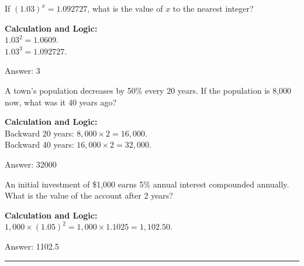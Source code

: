 \documentclass[11pt,paper=a4,answers]{exam}
\begin{document}
\begin{questions}
\vspace{40pt}

\question
If $(1.03)^x = 1.092727$, what is the value of $x$ to the nearest integer?

\begin{solution}
\textbf{Calculation and Logic:} \\
$1.03^2 = 1.0609$. \\
$1.03^3 = 1.092727$.

\vspace{25pt}

Answer: \colorbox{yellow!100}{3}
\end{solution}

\vspace{40pt}

\question
A town's population decreases by 50\% every 20 years. If the population is 8,000 now, what was it 40 years ago?

\begin{solution}
\textbf{Calculation and Logic:} \\
Backward 20 years: $8,000 \times 2 = 16,000$. \\
Backward 40 years: $16,000 \times 2 = 32,000$.

\vspace{25pt}

Answer: \colorbox{yellow!100}{32000}
\end{solution}

\vspace{40pt}

\question
An initial investment of \$1,000 earns 5\% annual interest compounded annually. What is the value of the account after 2 years?

\begin{solution}
\textbf{Calculation and Logic:} \\
$1,000 \times (1.05)^2 = 1,000 \times 1.1025 = 1,102.50$.

\vspace{25pt}

Answer: \colorbox{yellow!100}{1102.5}
\end{solution}


\end{questions}
\begin{center}
\rule{.5\textwidth}{1pt}
\end{center}
\end{document}
